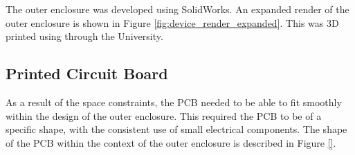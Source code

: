 \documentclass[a4paper,12pt]{article}
\begin{document}
The outer enclosure was developed using SolidWorks. An expanded render of the outer enclosure is shown in Figure \ref{fig:device_render_expanded}. This was 3D printed using through the University.



\subsection{Printed Circuit Board}
\label{sec:printed_circuit_board}

As a result of the space constraints, the PCB needed to be able to fit smoothly within the design of the outer enclosure. This required the PCB to be of a specific shape, with the consistent use of small electrical components. The shape of the PCB within the context of the outer enclosure is described in Figure \ref{}.

\newpage


\end{document}
